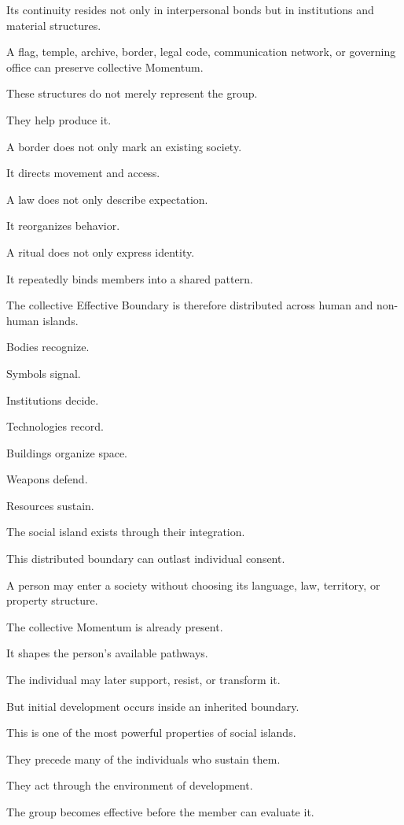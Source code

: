 Its continuity resides not only in interpersonal bonds but in institutions and material structures.

A flag, temple, archive, border, legal code, communication network, or governing office can preserve collective Momentum.

These structures do not merely represent the group.

They help produce it.

A border does not only mark an existing society.

It directs movement and access.

A law does not only describe expectation.

It reorganizes behavior.

A ritual does not only express identity.

It repeatedly binds members into a shared pattern.

The collective Effective Boundary is therefore distributed across human and non-human islands.

Bodies recognize.

Symbols signal.

Institutions decide.

Technologies record.

Buildings organize space.

Weapons defend.

Resources sustain.

The social island exists through their integration.

This distributed boundary can outlast individual consent.

A person may enter a society without choosing its language, law, territory, or property structure.

The collective Momentum is already present.

It shapes the person’s available pathways.

The individual may later support, resist, or transform it.

But initial development occurs inside an inherited boundary.

This is one of the most powerful properties of social islands.

They precede many of the individuals who sustain them.

They act through the environment of development.

The group becomes effective before the member can evaluate it.

